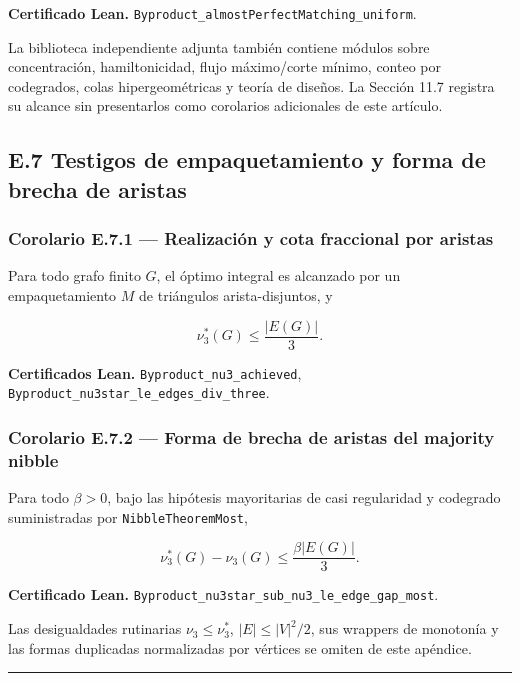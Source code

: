 \documentclass[
  spanish,
  11pt,
  a4paper,
]{article}
\begin{document}
\textbf{Certificado Lean.} \texttt{Byproduct\_almostPerfectMatching\_uniform}.

La biblioteca independiente adjunta también contiene módulos sobre concentración, hamiltonicidad, flujo máximo/corte mínimo, conteo por codegrados, colas hipergeométricas y teoría de diseños. La Sección 11.7 registra su alcance sin presentarlos como corolarios adicionales de este artículo.

\subsection{E.7 Testigos de empaquetamiento y forma de brecha de aristas}\label{e.7-testigos-de-empaquetamiento-y-forma-de-brecha-de-aristas}

\subsubsection{Corolario E.7.1 --- Realización y cota fraccional por aristas}\label{corolario-e.7.1-realizaciuxf3n-y-cota-fraccional-por-aristas}

Para todo grafo finito \(G\), el óptimo integral es alcanzado por un empaquetamiento \(M\) de triángulos arista-disjuntos, y

\[\nu_3^*(G)\le\frac{|E(G)|}{3}.\]

\textbf{Certificados Lean.} \texttt{Byproduct\_nu3\_achieved}, \texttt{Byproduct\_nu3star\_le\_edges\_div\_three}.

\subsubsection{Corolario E.7.2 --- Forma de brecha de aristas del majority nibble}\label{corolario-e.7.2-forma-de-brecha-de-aristas-del-majority-nibble}

Para todo \(\beta>0\), bajo las hipótesis mayoritarias de casi regularidad y codegrado suministradas por \texttt{NibbleTheoremMost},

\[\nu_3^*(G)-\nu_3(G)\le\frac{\beta|E(G)|}{3}.\]

\textbf{Certificado Lean.} \texttt{Byproduct\_nu3star\_sub\_nu3\_le\_edge\_gap\_most}.

Las desigualdades rutinarias \(\nu_3\le\nu_3^*\), \(|E|\le|V|^2/2\), sus wrappers de monotonía y las formas duplicadas normalizadas por vértices se omiten de este apéndice.

\begin{center}\rule{0.5\linewidth}{0.5pt}\end{center}
\end{document}
